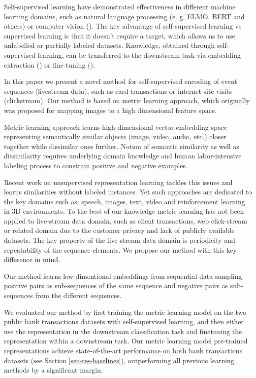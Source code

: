 \documentclass[sigconf]{acmart}
\begin{document}
Self-supervised learning have demonstrated effectiveness in different machine learning domains, such as natural language processing (e. g. ELMO\cite{ELMO2018}, BERT\cite{Devlin2019BERTPO} and others) or computer vision (\cite{doersch2015unsupervised}). The key advantage of self-supervised learning vs supervised learning is that it doesn't require a target, which allows us to use unlabelled or partially labeled datasets. Knowledge, obtained through self-supervised learning, can be transferred to the downstream task via embedding extraction (\cite{word2vec}) or fine-tuning (\cite{Devlin2019BERTPO}).

In this paper we present a novel method for self-supervised encoding of event sequences (livestream data), such as card transactions or internet site visits (clickstream). Our method is based on metric learning approach, which originally was proposed for mapping images to a high dimensional feature space.

Metric learning approach learns high-dimensional vector embedding space representing semantically similar objects (image, video, audio, etc.) closer together while dissimilar ones further. Notion of semantic similarity as well as dissimilarity requires underlying domain knowledge and human labor-intensive labeling process to constrain positive and negative examples. 

Recent work on unsupervised representation learning  tackles this issues and learns similarities without labeled instances. Yet such approaches are dedicated to the key domains such as: speech, images, text, video and reinforcement learning in 3D environments. To the best of our knowledge metric learning has not been applied to live-stream data domain, such as client transactions, web click-stream or related domain due to the customer privacy and lack of publicly available datasets. The key property of the live-stream data domain is periodicity and repeatability of the sequence elements. We propose our method with this key difference in mind.

Our method learns low-dimentional embeddings from sequential data sampling positive pairs as sub-sequences of the same sequence and negative pairs as sub-sequences from the different sequences.

We evaluated our method by first training the metric learning model on the two public bank transactions datasets with self-supervised learning, and then either use the representation in the downstream classification task and finetuning the representation within a downstream task. Our metric learning model pre-trained representations achieve state-of-the-art performance on both bank transactions datasets (see Section \ref{sec-res-baselines}), outperforming all previous learning methods by a significant margin.
\end{document}
